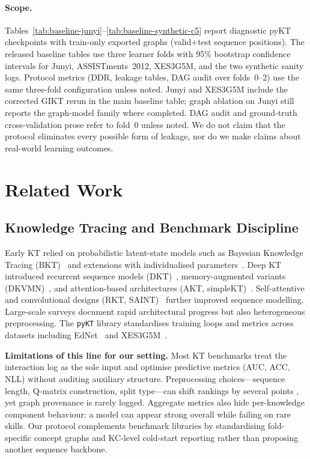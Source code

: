 \documentclass[runningheads]{llncs}
\newcommand{\KC}{knowledge component}
\newcommand{\DDR}{\textsc{DDR}}
\begin{document}
\paragraph{Scope.}
Tables~\ref{tab:baseline-junyi}--\ref{tab:baseline-synthetic-c5} report diagnostic
pyKT checkpoints with train-only exported graphs (valid+test sequence positions).
The released baseline tables use three learner folds with 95\% bootstrap confidence
intervals for Junyi, ASSISTments~2012, XES3G5M, and the two synthetic sanity logs.
Protocol metrics (\DDR{}, leakage tables, DAG audit over folds~0--2) use the same
three-fold configuration unless noted. Junyi and XES3G5M include the corrected GIKT
rerun in the main baseline table; graph ablation on Junyi still reports the
graph-model family where completed.
DAG audit and ground-truth cross-validation prose refer to fold~0 unless noted.
We do not claim that the protocol eliminates
every possible form of leakage, nor do we make claims about real-world
learning outcomes.
\section{Related Work}
\label{sec:related}

\subsection{Knowledge Tracing and Benchmark Discipline}
\label{sec:related-kt}
Early KT relied on probabilistic latent-state models such as Bayesian
Knowledge Tracing (BKT)~\cite{corbett1995bkt} and extensions with
individualised parameters~\cite{yudelson2013pfa,khajah2016das3h}.
Deep KT introduced recurrent sequence models (DKT)~\cite{piech2015dkt},
memory-augmented variants (DKVMN)~\cite{zhang2017dkvmn}, and
attention-based architectures (AKT, simpleKT)~\cite{ghosh2020akt,liu2023simplekt,chen2022dimkt,wang2023corekt}. Self-attentive and
convolutional designs (RKT, SAINT)~\cite{pandey2019rkt,shen2021saint}
further improved sequence modelling. Large-scale surveys
\cite{abdelrahman2023kt_survey} document rapid architectural progress
but also heterogeneous preprocessing. The \texttt{pyKT} library
\cite{liu2022pykt} standardises training loops and metrics across
datasets including EdNet~\cite{choi2020ednet} and
XES3G5M~\cite{xes3g5m2023}.

\textbf{Limitations of this line for our setting.}
Most KT benchmarks treat the interaction log as the sole input and
optimise predictive metrics (AUC, ACC, NLL) without auditing auxiliary
structure. Preprocessing choices---sequence length, Q-matrix
construction, split type---can shift rankings by several points
\cite{liu2022pykt,abdelrahman2023kt_survey}, yet graph provenance is
rarely logged. Aggregate metrics also hide per-\KC{} behaviour: a model
can appear strong overall while failing on rare skills. Our protocol
complements benchmark libraries by standardising fold-specific concept
graphs and KC-level cold-start reporting rather than proposing another
sequence backbone.
\end{document}
